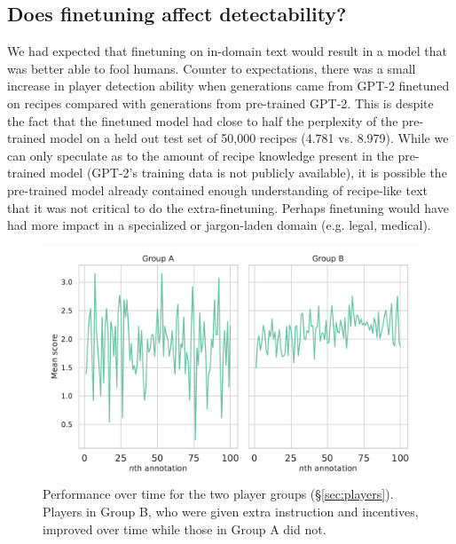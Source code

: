\subsection{Does finetuning affect detectability?}
We had expected that finetuning on in-domain text would result in a model that was better able to fool humans.
Counter to expectations, there was a small increase in player detection ability when generations came from GPT-2 finetuned on recipes compared with generations from pre-trained GPT-2. This is despite the fact that the finetuned model had close to half the perplexity of the pre-trained model on a held out test set of 50,000 recipes (4.781 vs. 8.979).
While we can only speculate as to the amount of recipe knowledge present in the pre-trained model (GPT-2's training data is not publicly available), it is possible the pre-trained model already contained enough understanding of recipe-like text that it was not critical to do the extra-finetuning.
Perhaps finetuning would have had more impact in a specialized or jargon-laden domain (e.g. legal, medical).



\begin{figure}[tb]
    \centering
    \includegraphics[scale=0.375]{figures/overtime.pdf}
    \caption{Performance over time for the two player groups (\S\ref{sec:players}). Players in Group B, who were given extra instruction and incentives, improved over time while those in Group A did not.}
    \label{fig:skill_over_time}
\end{figure}

